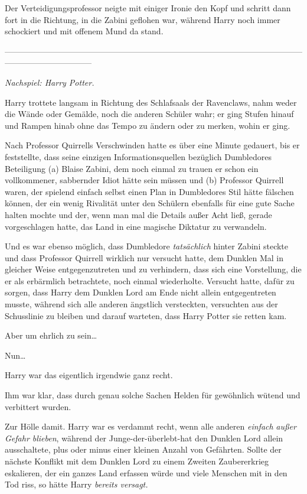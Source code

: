 {Der Verteidigungsprofessor neigte mit einiger Ironie den Kopf und schritt dann fort in die Richtung, in die Zabini geflohen war, während Harry noch immer schockiert und mit offenem Mund da stand.

--------------------------------------------------------------------------------------------------------------------------------------------

\emph{Nachspiel: Harry Potter.}

Harry trottete langsam in Richtung des Schlafsaals der Ravenclaws, nahm weder die Wände oder Gemälde, noch die anderen Schüler wahr; er ging Stufen hinauf und Rampen hinab ohne das Tempo zu ändern oder zu merken, wohin er ging.

Nach Professor Quirrells Verschwinden hatte es über eine Minute gedauert, bis er feststellte, dass seine einzigen Informationsquellen bezüglich Dumbledores Beteiligung (a) Blaise Zabini, dem noch einmal zu trauen er schon ein vollkommener, sabbernder Idiot hätte sein müssen und (b) Professor Quirrell waren, der spielend einfach selbst einen Plan in Dumbledores Stil hätte fälschen können, der ein wenig Rivalität unter den Schülern ebenfalls für eine gute Sache halten mochte und der, wenn man mal die Details außer Acht ließ, gerade vorgeschlagen hatte, das Land in eine magische Diktatur zu verwandeln.

Und es war ebenso möglich, dass Dumbledore \emph{tatsächlich} hinter Zabini steckte und dass Professor Quirrell wirklich nur versucht hatte, dem Dunklen Mal in gleicher Weise entgegenzutreten und zu verhindern, dass sich eine Vorstellung, die er als erbärmlich betrachtete, noch einmal wiederholte. Versucht hatte, dafür zu sorgen, dass Harry dem Dunklen Lord am Ende nicht allein entgegentreten musste, während sich alle anderen ängstlich versteckten, versuchten aus der Schusslinie zu bleiben und darauf warteten, dass Harry Potter sie retten kam.

Aber um ehrlich zu sein…

Nun…

Harry war das eigentlich irgendwie ganz recht.

Ihm war klar, dass durch genau solche Sachen Helden für gewöhnlich wütend und verbittert wurden.

Zur Hölle damit. Harry war es verdammt recht, wenn alle anderen \emph{einfach} \emph{außer Gefahr blieben}, während der Junge-der-überlebt-hat den Dunklen Lord allein ausschaltete, plus oder minus einer kleinen Anzahl von Gefährten. Sollte der nächste Konflikt mit dem Dunklen Lord zu einem Zweiten Zaubererkrieg eskalieren, der ein ganzes Land erfassen würde und viele Menschen mit in den Tod riss, so hätte Harry \emph{bereits versagt.}

}
